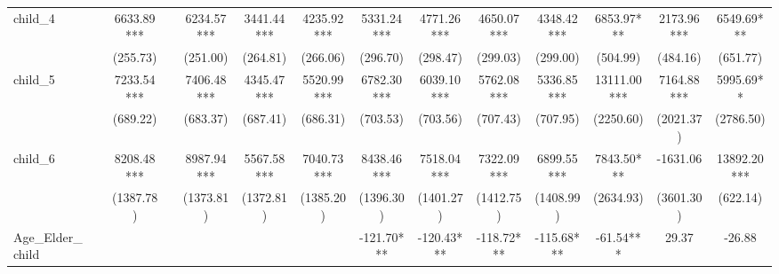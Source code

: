 \begin{subappendices}
{\begin{landscape}
\begin{table}[H]
{\begin{tabular}{lccccccccccccc}
child_4                                  &                    & 6633.89***              &                                  & 6234.57***  & 3441.44***               & 4235.92***        & 5331.24***  & 4771.26***           & 4650.07***              & 4348.42***               & 6853.97***            & 2173.96***                & 6549.69***                 \\
                                         &                    & (255.73)                &                                  & (251.00)    & (264.81)                 & (266.06)          & (296.70)    & (298.47)             & (299.03)                & (299.00)                 & (504.99)              & (484.16)                  & (651.77)                   \\
child_5                                  &                    & 7233.54***              &                                  & 7406.48***  & 4345.47***               & 5520.99***        & 6782.30***  & 6039.10***           & 5762.08***              & 5336.85***               & 13111.00***           & 7164.88***                & 5995.69**                  \\
                                         &                    & (689.22)                &                                  & (683.37)    & (687.41)                 & (686.31)          & (703.53)    & (703.56)             & (707.43)                & (707.95)                 & (2250.60)             & (2021.37)                 & (2786.50)                  \\
child_6                                  &                    & 8208.48***              &                                  & 8987.94***  & 5567.58***               & 7040.73***        & 8438.46***  & 7518.04***           & 7322.09***              & 6899.55***               & 7843.50***            & -1631.06                  & 13892.20***                \\
                                         &                    & (1387.78)               &                                  & (1373.81)   & (1372.81)                & (1385.20)         & (1396.30)   & (1401.27)            & (1412.75)               & (1408.99)                & (2634.93)             & (3601.30)                 & (622.14)                   \\
Age_Elder_child                          &                    &                         &                                  &             &                          &                   & -121.70***  & -120.43***           & -118.72***              & -115.68***               & -61.54***             & 29.37                     & -26.88                     \\

\end{tabular}}
\end{table}
\end{landscape}}
\end{subappendices}
